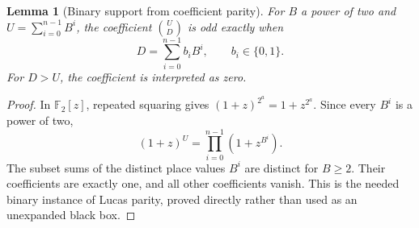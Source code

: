 \documentclass[11pt,letterpaper]{article}
\newtheorem{lemma}[theorem]{Lemma}
\theoremstyle{definition}\newtheorem{definition}[theorem]{Definition}
\theoremstyle{remark}\newtheorem{remark}[theorem]{Remark}
\begin{document}
\begin{lemma}[Binary support from coefficient parity]\label{ptr:ai:lem:parity}
For $B$ a power of two and $U=\sum_{i=0}^{n-1}B^i$, the coefficient $\binom UD$ is odd exactly when
\[
 D=\sum_{i=0}^{n-1}b_iB^i,\qquad b_i\in\{0,1\}.
\]
For $D>U$, the coefficient is interpreted as zero.
\end{lemma}
\begin{proof}
In $\mathbb F_2[z]$, repeated squaring gives $(1+z)^{2^a}=1+z^{2^a}$. Since every $B^i$ is a power of two,
\[
 (1+z)^U=\prod_{i=0}^{n-1}(1+z^{B^i}).
\]
The subset sums of the distinct place values $B^i$ are distinct for $B\ge2$. Their coefficients are exactly one, and all other coefficients vanish. This is the needed binary instance of Lucas parity, proved directly rather than used as an unexpanded black box.
\end{proof}
\end{document}
